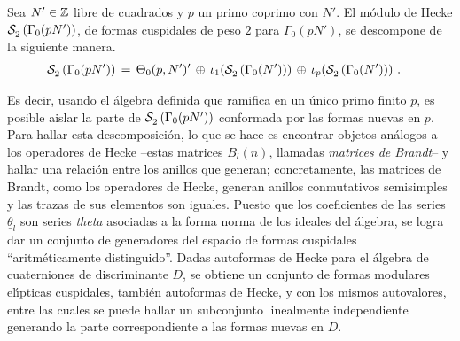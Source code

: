 \begin{teoEichlerIntro}[Eichler]
	Sea $N'\in\mathbb{Z}$ libre de cuadrados y $p$ un primo coprimo con $N'$.
	El m\'{o}dulo de Hecke $\mathcal{S}^{}_{2}\left(\Gamma_{0}(pN')\right)$, de formas
	cuspidales de peso $2$ para $\Gamma_{0}(pN')$, se descompone de la
	siguiente manera.
	\begin{align*}
		\mathcal{S}^{}_{2}\left(\Gamma_{0}(pN')\right) & \,=\,\Theta_{0}(p,N')'\,\oplus\,
			\iota_{1}(\mathcal{S}^{}_{2}\left(\Gamma_{0}(N')\right))\,\oplus\,
			\iota_{p}(\mathcal{S}^{}_{2}\left(\Gamma_{0}(N')\right))
		\text{ .}
	\end{align*}
\end{teoEichlerIntro}

Es decir, usando el \'{a}lgebra definida que ramifica en un \'{u}nico primo
finito $p$, es posible aislar la parte de $\mathcal{S}^{}_{2}\left(\Gamma_{0}(pN')\right)$
conformada por las formas nuevas en $p$. Para hallar esta descomposici\'{o}n,
lo que se hace es encontrar objetos an\'{a}logos a los operadores de Hecke
--estas matrices $B_{l}(n)$, llamadas \emph{matrices de Brandt}--
y hallar una relaci\'{o}n entre los anillos que generan;
concretamente, las matrices de Brandt, como los operadores de Hecke,
generan anillos conmutativos semisimples y las trazas de sus elementos son
iguales. Puesto que los coeficientes de las series $\underline{\theta}_{l}$
son series \emph{theta} 
asociadas a la forma norma de los ideales del \'{a}lgebra, se logra dar un
conjunto de generadores del espacio de formas cuspidales ``aritm\'{e}ticamente
distinguido''. Dadas autoformas de Hecke para el \'{a}lgebra de cuaterniones
de discriminante $D$, se obtiene un conjunto de formas modulares
el\'{\i}pticas cuspidales, tambi\'{e}n autoformas de Hecke, y con los
mismos autovalores, entre las cuales se puede hallar un subconjunto
linealmente independiente generando la parte correspondiente a las formas
nuevas en $D$.


